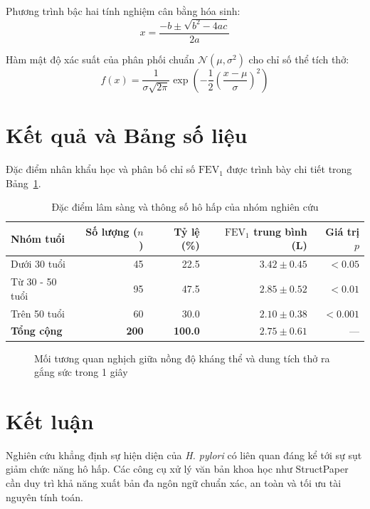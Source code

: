\documentclass[10pt,a4paper]{article}
\begin{document}
Phương trình bậc hai tính nghiệm cân bằng hóa sinh:
\begin{equation}
x = \frac{-b \pm \sqrt{b^2 - 4ac}}{2a}
\end{equation}

Hàm mật độ xác suất của phân phối chuẩn $\mathcal{N}(\mu, \sigma^2)$ cho chỉ số thể tích thở:
\begin{equation}
f(x) = \frac{1}{\sigma \sqrt{2\pi}} \exp\left( -\frac{1}{2}\left(\frac{x - \mu}{\sigma}\right)^2 \right)
\end{equation}

\section{Kết quả và Bảng số liệu}
Đặc điểm nhân khẩu học và phân bố chỉ số $\text{FEV}_1$ được trình bày chi tiết trong Bảng~\ref{tab:clinical}.

\begin{table}[htbp]
\centering
\caption{Đặc điểm lâm sàng và thông số hô hấp của nhóm nghiên cứu}
\label{tab:clinical}
\begin{tabular}{lrrrr}
\toprule
\textbf{Nhóm tuổi} & \textbf{Số lượng ($n$)} & \textbf{Tỷ lệ (\%)} & \textbf{$\text{FEV}_1$ trung bình (L)} & \textbf{Giá trị $p$} \\
\midrule
Dưới 30 tuổi  & 45  & 22.5 & $3.42 \pm 0.45$ & $< 0.05$ \\
Từ 30 - 50 tuổi & 95  & 47.5 & $2.85 \pm 0.52$ & $< 0.01$ \\
Trên 50 tuổi  & 60  & 30.0 & $2.10 \pm 0.38$ & $< 0.001$ \\
\midrule
\textbf{Tổng cộng} & \textbf{200} & \textbf{100.0} & \textbf{$2.75 \pm 0.61$} & --- \\
\bottomrule
\end{tabular}
\end{table}

\begin{figure}[htbp]
\centering
{}
\caption{Mối tương quan nghịch giữa nồng độ kháng thể và dung tích thở ra gắng sức trong 1 giây}
\label{fig:scatter}
\end{figure}

\section{Kết luận}
Nghiên cứu khẳng định sự hiện diện của \textit{H. pylori} có liên quan đáng kể tới sự sụt giảm chức năng hô hấp. Các công cụ xử lý văn bản khoa học như StructPaper cần duy trì khả năng xuất bản đa ngôn ngữ chuẩn xác, an toàn và tối ưu tài nguyên tính toán.
\end{document}
